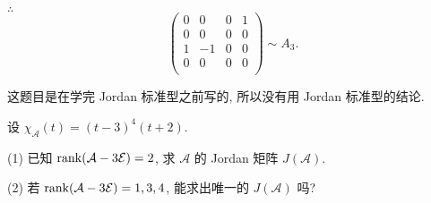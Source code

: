 \documentclass[color=black,device=normal,lang=cn,mode=geye]{elegantnote}
\begin{document}
\begin{solution}
    $\therefore$
    \[\begin{pmatrix}
        0 & 0 & 0 & 1 \\
        0 & 0 & 0 & 0 \\
        1 & -1 & 0 & 0 \\
        0 & 0 & 0 & 0 \\
    \end{pmatrix}\sim A_3.\]
\end{solution}
\begin{note}
    这题目是在学完 Jordan 标准型之前写的, 所以没有用 Jordan 标准型的结论.
\end{note}
\begin{exercise}%
    设 $\chi_\mathcal{A}(t)=(t-3)^4(t+2)$.

    (1) 已知 $\operatorname{rank} (\mathcal{A}-3\mathcal{E})=2$, 求 $\mathcal{A}$ 的 Jordan 矩阵 $J(\mathcal{A})$.

    (2) 若 $\operatorname{rank} (\mathcal{A}-3\mathcal{E})=1,3,4$, 能求出唯一的 $J(\mathcal{A})$ 吗?
\end{exercise}
\end{document}
